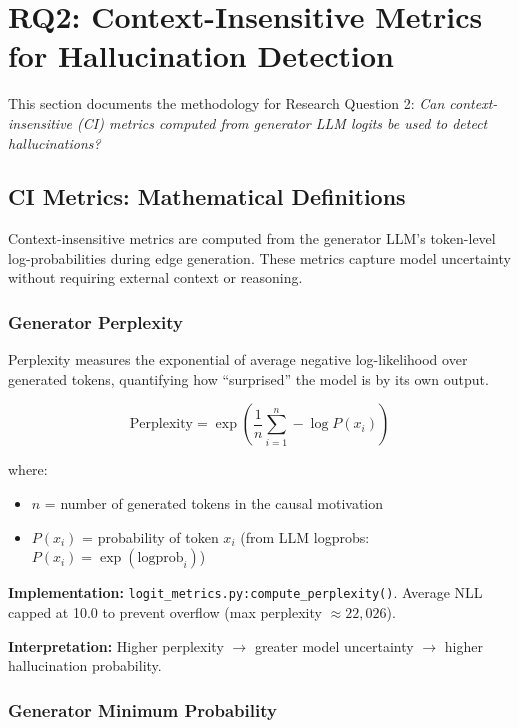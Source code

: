 \section{RQ2: Context-Insensitive Metrics for Hallucination Detection}
\label{sec:rq2_statistical_methods}

This section documents the methodology for Research Question 2: \textit{Can context-insensitive (CI) metrics computed from generator LLM logits be used to detect hallucinations?}

\subsection{CI Metrics: Mathematical Definitions}
\label{sec:ci_metrics_definitions}

Context-insensitive metrics are computed from the generator LLM's token-level log-probabilities during edge generation. These metrics capture model uncertainty without requiring external context or reasoning.

\subsubsection{Generator Perplexity}

Perplexity measures the exponential of average negative log-likelihood over generated tokens, quantifying how ``surprised'' the model is by its own output.

\begin{equation}
\text{Perplexity} = \exp\left(\frac{1}{n}\sum_{i=1}^{n} -\log P(x_i)\right)
\label{eq:perplexity}
\end{equation}

where:
\begin{itemize}
    \item $n$ = number of generated tokens in the causal motivation
    \item $P(x_i)$ = probability of token $x_i$ (from LLM logprobs: $P(x_i) = \exp(\text{logprob}_i)$)
\end{itemize}

\textbf{Implementation:} \texttt{logit\_metrics.py:compute\_perplexity()}. Average NLL capped at 10.0 to prevent overflow (max perplexity $\approx 22{,}026$).

\textbf{Interpretation:} Higher perplexity $\rightarrow$ greater model uncertainty $\rightarrow$ higher hallucination probability.

\subsubsection{Generator Minimum Probability}

